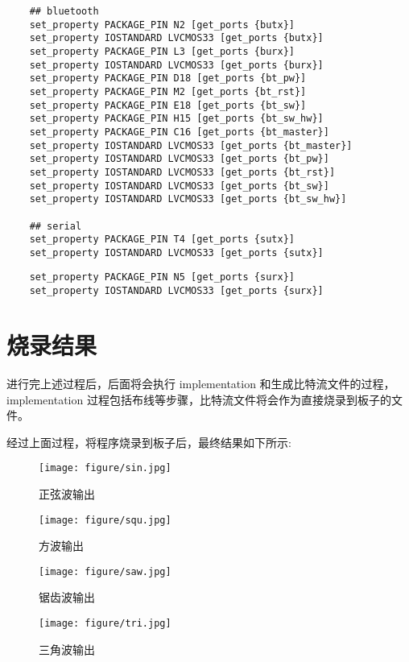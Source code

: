 {\begin{spacing}{1.5}
\begin{lstlisting}
	## bluetooth
	set_property PACKAGE_PIN N2 [get_ports {butx}]
	set_property IOSTANDARD LVCMOS33 [get_ports {butx}]
	set_property PACKAGE_PIN L3 [get_ports {burx}]
	set_property IOSTANDARD LVCMOS33 [get_ports {burx}]
	set_property PACKAGE_PIN D18 [get_ports {bt_pw}]
	set_property PACKAGE_PIN M2 [get_ports {bt_rst}]
	set_property PACKAGE_PIN E18 [get_ports {bt_sw}]
	set_property PACKAGE_PIN H15 [get_ports {bt_sw_hw}]
	set_property PACKAGE_PIN C16 [get_ports {bt_master}]
	set_property IOSTANDARD LVCMOS33 [get_ports {bt_master}]
	set_property IOSTANDARD LVCMOS33 [get_ports {bt_pw}]
	set_property IOSTANDARD LVCMOS33 [get_ports {bt_rst}]
	set_property IOSTANDARD LVCMOS33 [get_ports {bt_sw}]
	set_property IOSTANDARD LVCMOS33 [get_ports {bt_sw_hw}]
	
	## serial
	set_property PACKAGE_PIN T4 [get_ports {sutx}]
	set_property IOSTANDARD LVCMOS33 [get_ports {sutx}]
	\end{lstlisting}
	\begin{lstlisting}
	set_property PACKAGE_PIN N5 [get_ports {surx}]
	set_property IOSTANDARD LVCMOS33 [get_ports {surx}]
	\end{lstlisting}

	\section{烧录结果}
	进行完上述过程后，后面将会执行 implementation 和生成比特流文件的过程， implementation 过程包括布线等步骤，比特流文件将会作为直接烧录到板子的文件。

	经过上面过程，将程序烧录到板子后，最终结果如下所示:
	\newline
	\begin{figure}[htbp]
		\centering
		\begin{minipage}{0.49\linewidth}
			\centering
			\texttt{[image: figure/sin.jpg]}
			\caption{正弦波输出}
			\label{sin}
		\end{minipage}
		\begin{minipage}{0.49\linewidth}
			\centering
			\texttt{[image: figure/squ.jpg]}
			\caption{方波输出}
			\label{squ}
		\end{minipage}
	\end{figure}
	\newline
	\vspace{1cm}
	\begin{figure}[htbp]
		\centering
		\begin{minipage}{0.49\linewidth}
			\centering
			\texttt{[image: figure/saw.jpg]}
			\caption{锯齿波输出}
			\label{saw}
		\end{minipage}
		\begin{minipage}{0.49\linewidth}
			\centering
			\texttt{[image: figure/tri.jpg]}
			\caption{三角波输出}
			\label{tri}
		\end{minipage}
	\end{figure}


\end{spacing}}
